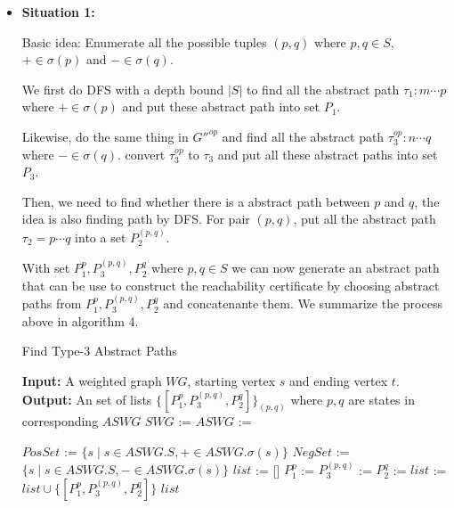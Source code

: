 \documentclass[12pt]{article}
\begin{document}
\begin{itemize}
\item \textbf{Situation 1:}

Basic idea: Enumerate all the possible tuples $(p, q)$ where $p, q\in S$, $+ \in \sigma(p) $ and $- \in \sigma(q)$.

We first do DFS with a depth bound $|S|$ to find all the abstract path $\tau_1: m\cdots p$ where $+ \in \sigma(p)$ and put these abstract path into set $P_1$.

Likewise, do the same thing in $G''^{op}$ and find all the abstract path $\tau^{op}_3: n\cdots q$ where $-\in \sigma(q)$. convert $\tau^{op}_3$ to $\tau_3$ and put all these abstract paths into set $P_3$.

Then,  we need to find whether there is a abstract path between $p$ and $q$, the idea is also finding path by DFS. For  pair $(p,q)$, put all the abstract path $\tau_2 = p\cdots q$ into a set $P^{(p,q)}_2$.

With set $P_1^p, P^{(p,q)}_3, P_2^q$ where $p,q\in S$ we can now generate an abstract path that can be use to construct the reachability certificate by choosing abstract paths from $P_1^p, P_3^{(p,q)}, P_2^q$ and concatenante them. We summarize the process above in algorithm 4.

\begin{algorithm}
	\caption{Find Type-3 Abstract Paths}
	\begin{algorithmic}
		\State {}
		\State\textbf{Input:} A weighted graph $WG$, starting vertex $s$ and ending vertex $t$.
		\State\textbf{Output:} An set of lists $\{[P_1^p, P_3^{(p,q)}, P_2^q]\}_{(p,q)}$ where $p,q$ are states in corresponding $ASWG$
		\State $SWG$ := 
		\State $ASWG$ := 
		
		\State $PosSet$ := $\{s\mid s\in ASWG.S, +\in ASWG.\sigma(s)\}$
		\State $NegSet$ := $\{s\mid s\in ASWG.S, -\in ASWG.\sigma(s)\}$
		\State $list$ := []
			\State $P_1^p$ := 
				\State $P_3^{(p,q)}$ := 
				\State $P_2^{q}$ := 
				\State $list$ := $list \cup \{[P_1^p, P_3^{(p,q)}, P_2^q]\}$
			\EndFor
		\EndFor
		\State \Return $list$
		\EndFunction
	
		
			

\end{algorithmic}
\end{algorithm}
\end{itemize}
\end{document}
